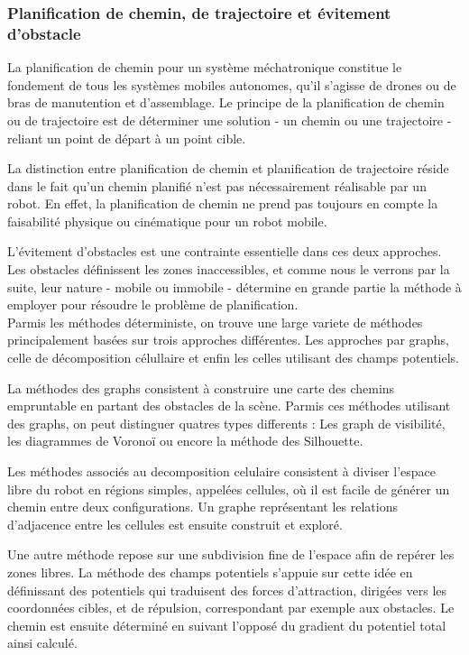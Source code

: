 \documentclass[main.tex]{subfiles}
\begin{document}
\subsubsection{Planification de chemin, de trajectoire et évitement d'obstacle}

La planification de chemin pour un système méchatronique constitue le fondement de tous les systèmes mobiles autonomes, qu'il s'agisse de drones ou de bras de manutention et d'assemblage. Le principe de la planification de chemin ou de trajectoire est de déterminer une solution - un chemin ou une trajectoire - reliant un point de départ à un point cible.

La distinction entre planification de chemin et planification de trajectoire réside dans le fait qu'un chemin planifié n'est pas nécessairement réalisable par un robot. En effet, la planification de chemin ne prend pas toujours en compte la faisabilité physique ou cinématique pour un robot mobile.

L'évitement d'obstacles est une contrainte essentielle dans ces deux approches. Les obstacles définissent les zones inaccessibles, et comme nous le verrons par la suite, leur nature - mobile ou immobile - détermine en grande partie la méthode à employer pour résoudre le problème de planification.\\

Parmis les méthodes déterministe, on trouve une large variete de méthodes principalement basées sur trois approches différentes. Les approches par graphs, celle de décomposition célullaire et enfin les celles utilisant des champs potentiels.\cite{latombe_robot_1991,bhattacharyya_robot_2008}

La méthodes des graphs consistent à construire une carte des chemins empruntable en partant des obstacles de la scène. Parmis ces méthodes utilisant des graphs, on peut distinguer quatres types differents : Les graph de visibilité\cite{visibility_graph_1979}, les diagrammes de Voronoï \cite{garrido_path_2006} ou encore la méthode des Silhouette\cite{bhattacharyya_robot_2008}.

Les méthodes associés au decomposition celulaire consistent à diviser l'espace libre du robot en régions simples, appelées cellules, où il est facile de générer un chemin entre deux configurations. Un graphe représentant les relations d'adjacence entre les cellules est ensuite construit et exploré.\cite{latombe_robot_1991,zhu_new_1991,kedem_efficient_1990,avnaim_practical_1988}

Une autre méthode repose sur une subdivision fine de l'espace afin de repérer les zones libres. La méthode des champs potentiels s'appuie sur cette idée en définissant des potentiels qui traduisent des forces d'attraction, dirigées vers les coordonnées cibles, et de répulsion, correspondant par exemple aux obstacles. Le chemin est ensuite déterminé en suivant l'opposé du gradient du potentiel total ainsi calculé.\cite{latombe_robot_1991,koren_potential_1991}
\end{document}
